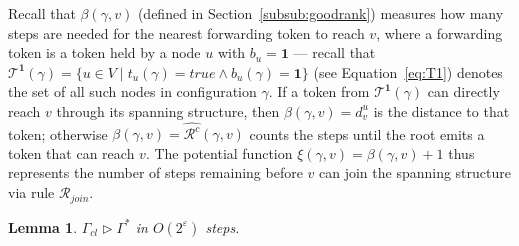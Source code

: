 \documentclass[a4paper, 12pt]{article}
\newtheorem{lemma}[theorem]{Lemma}
\newcommand{\bo}{\mathbf{1}}
\newcommand{\Rjoin}{$\mathscr{R}_{join}$}
\begin{document}
\medskip
Recall that $\beta(\gamma, v)$ (defined in 
Section~\ref{subsub:goodrank}) measures how many steps are needed for 
the nearest forwarding token to reach $v$, where a forwarding token is 
a token held by a node $u$ with $b_u = \bo$ — recall that 
$\mathcal{T}^{\bo}(\gamma) = \{u \in V \mid t_u(\gamma) = \mathit{true} 
\wedge b_u(\gamma) = \bo\}$ (see Equation~\ref{eq:T1}) denotes the set 
of all such nodes in configuration $\gamma$. If a token from 
$\mathcal{T}^{\bo}(\gamma)$ can directly reach $v$ through its spanning 
structure, then $\beta(\gamma, v) = d^u_v$ is the distance to that 
token; otherwise $\beta(\gamma, v) = \widehat{\mathcal{R}^c}(\gamma, v)$ 
counts the steps until the root emits a token that can reach $v$. The 
potential function $\xi(\gamma, v) = \beta(\gamma, v) + 1$ thus 
represents the number of steps remaining before $v$ can join the 
spanning structure via rule \Rjoin.
\begin{lemma}
\label{lem:BFS}
$\Gamma_{cl} \triangleright \Gamma^*$ in $O(2^\varepsilon)$ steps.
\end{lemma}
\end{document}
